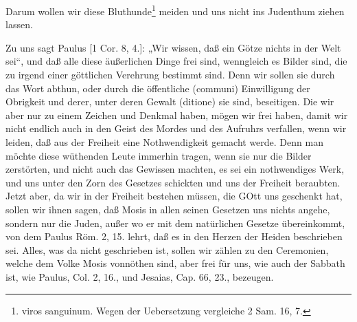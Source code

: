 Darum wollen wir diese Bluthunde\footnote{viros sanguinum. Wegen der Uebersetzung vergleiche 2 Sam. 16, 7.} meiden und uns nicht ins Judenthum ziehen lassen.

Zu uns sagt Paulus [1 Cor. 8, 4.]: „Wir wissen, daß ein Götze nichts in der Welt sei“, und daß alle diese äußerlichen Dinge frei sind, wenngleich es Bilder sind, die zu irgend einer göttlichen Verehrung bestimmt sind. Denn wir sollen sie durch das Wort abthun, oder durch die öffentliche (communi) Einwilligung der Obrigkeit und derer, unter deren Gewalt (ditione) sie sind, beseitigen. Die wir aber nur zu einem Zeichen und Denkmal haben, mögen wir frei haben, damit wir nicht endlich auch in den Geist des Mordes und des Aufruhrs verfallen, wenn wir leiden, daß aus der Freiheit eine Nothwendigkeit gemacht werde. Denn man möchte diese wüthenden Leute immerhin tragen, wenn sie nur die Bilder zerstörten, und nicht auch das Gewissen machten, es sei ein nothwendiges Werk, und uns unter den Zorn des Gesetzes schickten und uns der Freiheit beraubten. Jetzt aber, da wir in der Freiheit bestehen müssen, die GOtt uns geschenkt hat, sollen wir ihnen sagen, daß Mosis in allen seinen Gesetzen uns nichts angehe, sondern nur die Juden, außer wo er mit dem natürlichen Gesetze übereinkommt, von dem Paulus Röm. 2, 15. lehrt, daß es in den Herzen der Heiden beschrieben sei. Alles, was da nicht geschrieben ist, sollen wir zählen zu den Ceremonien, welche dem Volke Mosis vonnöthen sind, aber frei für uns, wie auch der Sabbath ist, wie Paulus, Col. 2, 16., und Jesaias, Cap. 66, 23., bezeugen.

